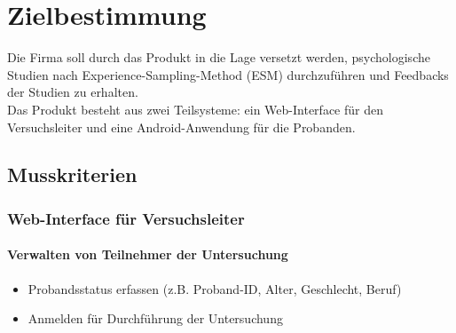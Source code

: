 \documentclass[a4paper]{scrreprt}
\begin{document}
    \tableofcontents

    \chapter{Zielbestimmung}
        Die Firma soll durch das Produkt in die Lage versetzt werden, psychologische Studien nach Experience-Sampling-Method (ESM) durchzuf\"uhren und Feedbacks der Studien zu erhalten.\\

        \noindent Das Produkt besteht aus zwei Teilsysteme: ein Web-Interface f\"ur den Versuchsleiter und eine Android-Anwendung f\"ur die Probanden.


        \section{Musskriterien}
            \vspace*{0.3cm}

            \subsection{Web-Interface f\"ur Versuchsleiter}
                \vspace*{0.2cm}

                \subsubsection{Verwalten von Teilnehmer der Untersuchung}
                    \begin{itemize}
                        \item Probandsstatus erfassen (z.B. Proband-ID, Alter, Geschlecht, Beruf)
                        \item Anmelden f\"ur Durchf\"uhrung der Untersuchung
                    \end{itemize}
\end{document}
